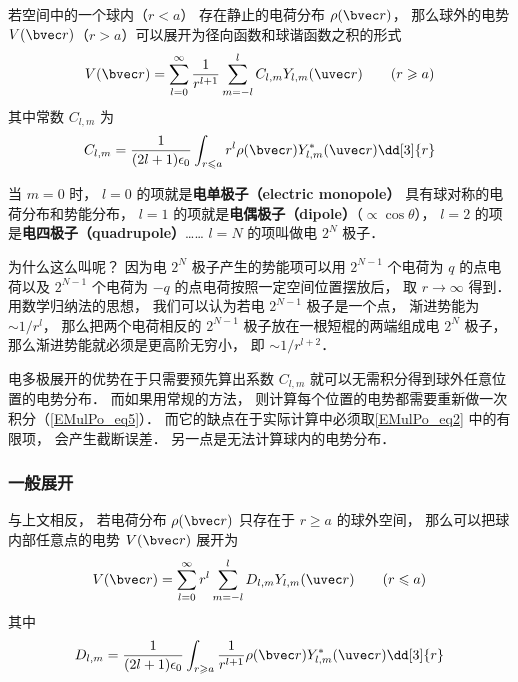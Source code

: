 

若空间中的一个球内（$r < a$） 存在静止的电荷分布 $\rho(\bvec r)$， 那么球外的电势 $V(\bvec r)$（$r > a$）可以展开为径向函数和球谐函数之积的形式
\begin{equation}\label{EMulPo_eq2}
V(\bvec r) = \sum_{l = 0}^\infty \frac{1}{r^{l+1}}\sum_{m = -l}^l C_{l,m} Y_{l,m}(\uvec r) \qquad (r \geqslant a)
\end{equation}
其中常数 $C_{l,m}$ 为
\begin{equation}
C_{l,m} = \frac{1}{(2l+1)\epsilon_0} \int_{r\leqslant a} r^l \rho(\bvec r) Y_{l,m}^*(\uvec r) \dd[3]{r}
\end{equation}

当 $m = 0$ 时， $l = 0$ 的项就是\textbf{电单极子（electric monopole）} 具有球对称的电荷分布和势能分布， $l = 1$ 的项就是\textbf{电偶极子（dipole）}（$\propto\cos \theta$）， $l = 2$ 的项是\textbf{电四极子（quadrupole）}……  $l = N$ 的项叫做电 $2^N$ 极子．

为什么这么叫呢？ 因为电 $2^N$ 极子产生的势能项可以用 $2^{N-1}$ 个电荷为 $q$ 的点电荷以及 $2^{N-1}$ 个电荷为 $-q$ 的点电荷按照一定空间位置摆放后， 取 $r \to \infty$ 得到． 用数学归纳法的思想， 我们可以认为若电 $2^{N-1}$ 极子是一个点， 渐进势能为 $\sim 1/r^l$， 那么把两个电荷相反的 $2^{N-1}$ 极子放在一根短棍的两端组成电 $2^N$ 极子， 那么渐进势能就必须是更高阶无穷小， 即 $\sim 1/r^{l+2}$．

电多极展开的优势在于只需要预先算出系数 $C_{l,m}$ 就可以无需积分得到球外任意位置的电势分布． 而如果用常规的方法， 则计算每个位置的电势都需要重新做一次积分（\autoref{EMulPo_eq5}）． 而它的缺点在于实际计算中必须取\autoref{EMulPo_eq2} 中的有限项， 会产生截断误差． 另一点是无法计算球内的电势分布．

\subsubsection{一般展开}
与上文相反， 若电荷分布 $\rho(\bvec r)$ 只存在于 $r \geqslant a$ 的球外空间， 那么可以把球内部任意点的电势 $V(\bvec r)$ 展开为
\begin{equation}\label{EMulPo_eq4}
V(\bvec r) = \sum_{l = 0}^\infty r^l \sum_{m = -l}^l D_{l,m} Y_{l,m}(\uvec r) \qquad (r \leqslant a)
\end{equation}
其中
\begin{equation}\label{EMulPo_eq3}
D_{l,m} = \frac{1}{(2l+1)\epsilon_0} \int_{r\geqslant a} \frac{1}{r^{l+1}} \rho(\bvec r) Y_{l,m}^*(\uvec r) \dd[3]{r}
\end{equation}

